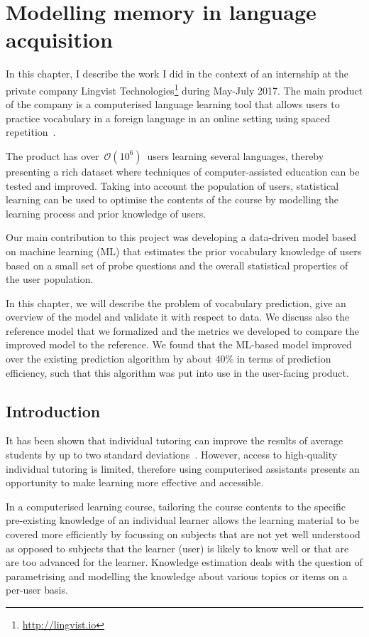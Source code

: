 \chapter{Modelling memory in language acquisition}

In this chapter, I describe the work I did in the context of an internship at the private company Lingvist Technologies\footnote{\url{http://lingvist.io}} during May-July 2017. The main product of the company is a computerised language learning tool that allows users to practice vocabulary in a foreign language in an online setting using spaced repetition~\cite{lingvist}.

The product has over~$\mathcal{O}(10^6)$~users learning several languages, thereby presenting a rich dataset where techniques of computer-assisted education can be tested and improved. Taking into account the population of users, statistical learning can be used to optimise the contents of the course by modelling the learning process and prior knowledge of users.

Our main contribution to this project was developing a data-driven model based on machine learning (ML) that estimates the prior vocabulary knowledge of users based on a small set of probe questions and the overall statistical properties of the user population. 

In this chapter, we will describe the problem of vocabulary prediction, give an overview of the model and validate it with respect to data. We discuss also the reference model that we formalized and the metrics we developed to compare the improved model to the reference. We found that the ML-based model improved over the existing prediction algorithm by about 40\% in terms of prediction efficiency, such that this algorithm was put into use in the user-facing product.

\section{Introduction}
It has been shown that individual tutoring can improve the results of average students by up to two standard deviations~\cite{corbett2001cognitive}. However, access to high-quality individual tutoring is limited, therefore using computerised assistants presents an opportunity to make learning more effective and accessible.

In a computerised learning course, tailoring the course contents to the specific pre-existing knowledge of an individual learner allows the learning material to be covered more efficiently by focussing on subjects that are not yet well understood as opposed to subjects that the learner (user) is likely to know well or that are are too advanced for the learner. Knowledge estimation deals with the question of parametrising and modelling the knowledge about various topics or items on a per-user basis. 

